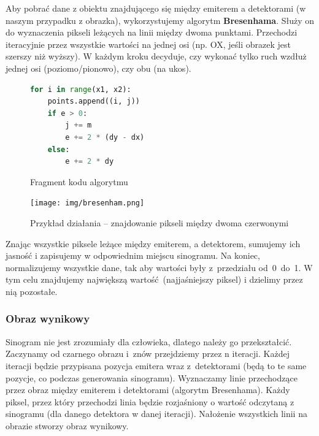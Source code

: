\documentclass[polish,polish,a4paper]{article}
\begin{document}
				Aby pobrać dane z obiektu znajdującego się między emiterem a detektorami (w naszym przypadku z obrazka),
				 wykorzystujemy algorytm \textbf{Bresenhama}.
				  Służy on do wyznaczenia pikseli leżących na linii między dwoma punktami. 
				  Przechodzi iteracyjnie przez wszystkie wartości na jednej osi
				   (np. OX, jeśli obrazek jest szerszy niż wyższy).
				    W każdym kroku decyduje,
				     czy wykonać tylko ruch wzdłuż jednej osi (poziomo/pionowo), czy obu (na ukos).
				
				\begin{figure}[!h]
					\centering
					\begin{minipage}{0.4\linewidth}
						\begin{lstlisting}[language=Python, frame=single]
for i in range(x1, x2):
    points.append((i, j))
    if e > 0:
        j += m
        e += 2 * (dy - dx)
    else:
        e += 2 * dy
						\end{lstlisting}
						\caption{Fragment kodu algorytmu}
					\end{minipage}
					\hfill
					\begin{minipage}{0.45\linewidth}
						\texttt{[image: img/bresenham.png]}
						\caption{Przykład działania -- znajdowanie pikseli między dwoma czerwonymi}
					\end{minipage}
				\end{figure}
				
				Znając wszystkie piksele leżące między emiterem, a detektorem, 
				sumujemy ich jasność i zapisujemy w odpowiednim miejscu sinogramu.
				Na koniec, normalizujemy wszystkie dane, tak aby wartości były z~przedziału od~0~do~1.
				 W tym celu znajdujemy największą wartość (najjaśniejszy piksel) i dzielimy przez nią pozostałe.
				
				\subsubsection{Obraz wynikowy}
					Sinogram nie jest zrozumiały dla człowieka, 
					dlatego należy go przekształcić.
					Zaczynamy od czarnego obrazu i~znów przejdziemy przez n iteracji.
					Każdej iteracji będzie przypisana pozycja emitera wraz z~detektorami 
					(będą to te same pozycje, co podczas generowania sinogramu).
					Wyznaczamy linie przechodzące przez obraz między emiterem i detektorami (algorytm Bresenhama).
					Każdy piksel, przez który przechodzi linia będzie rozjaśniony o wartość odczytaną z sinogramu 
					(dla danego detektora w danej iteracji). 
					Nałożenie wszystkich linii na obrazie stworzy obraz wynikowy.
				
\end{document}
